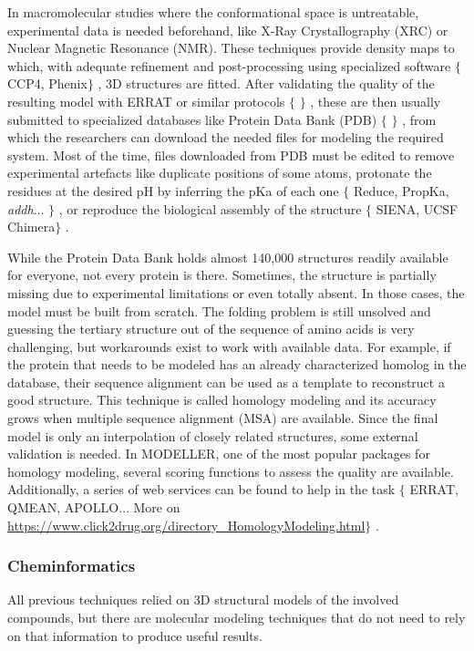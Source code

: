 In macromolecular studies where the conformational space is untreatable, experimental data is needed beforehand, like X-Ray Crystallography (XRC) or Nuclear Magnetic Resonance (NMR). These techniques provide density maps to which, with adequate refinement and post-processing using specialized software $ \{ $ CCP4, Phenix$ \} $ , 3D structures are fitted. After validating the quality of the resulting model with ERRAT or similar protocols $ \{ $ $ \} $ , these are then usually submitted to specialized databases like Protein Data Bank (PDB) $ \{ $ $ \} $ , from which the researchers can download the needed files for modeling the required system. Most of the time, files downloaded from PDB must be edited to remove experimental artefacts like duplicate positions of some atoms, protonate the residues at the desired pH by inferring the pKa of each one $ \{ $ Reduce, PropKa, \textit{addh}$ \ldots $ $ \} $ , or reproduce the biological assembly of the structure $ \{ $ SIENA, UCSF Chimera$ \} $ .

While the Protein Data Bank holds almost 140,000 structures readily available for everyone, not every protein is there. Sometimes, the structure is partially missing due to experimental limitations or even totally absent. In those cases, the model must be built from scratch. The folding problem is still unsolved and guessing the tertiary structure out of the sequence of amino acids is very challenging, but workarounds exist to work with available data. For example, if the protein that needs to be modeled has an already characterized homolog in the database, their sequence alignment can be used as a template to reconstruct a good structure. This technique is called homology modeling and its accuracy grows when multiple sequence alignment (MSA) are available. Since the final model is only an interpolation of closely related structures, some external validation is needed. In MODELLER, one of the most popular packages for homology modeling, several scoring functions to assess the quality are available. Additionally, a series of web services can be found to help in the task $ \{ $ ERRAT, QMEAN, APOLLO$ \ldots $  More on \href{https://www.click2drug.org/directory\_HomologyModeling.html}{https://www.click2drug.org/directory\_HomologyModeling.html}$ \} $ .\

\subsubsection{Cheminformatics}
All previous techniques relied on 3D structural models of the involved compounds, but there are molecular modeling techniques that do not need to rely on that information to produce useful results.

